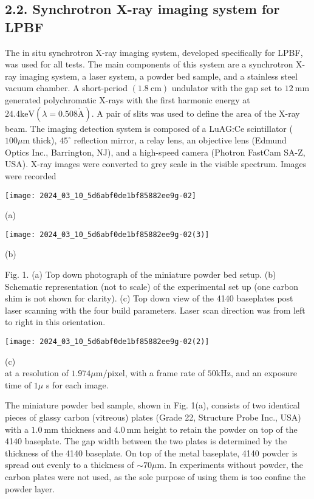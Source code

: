 \documentclass[10pt]{article}
\def\AA{\mathring{\mathrm{A}}}
\begin{document}
\subsection*{2.2. Synchrotron X-ray imaging system for LPBF}
The in situ synchrotron X-ray imaging system, developed specifically for LPBF, was used for all tests. The main components of this system are a synchrotron X-ray imaging system, a laser system, a powder bed sample, and a stainless steel vacuum chamber. A short-period $(1.8 \mathrm{~cm})$ undulator with the gap set to $12 \mathrm{~mm}$ generated polychromatic X-rays with the first harmonic energy at $24.4 \mathrm{keV}(\lambda=0.508 \AA)$. A pair of slits was used to define the area of the X-ray beam. The imaging detection system is composed of a LuAG:Ce scintillator ( $100 \mu \mathrm{m}$ thick), $45^{\circ}$ reflection mirror, a relay lens, an objective lens (Edmund Optics Inc., Barrington, NJ), and a high-speed camera (Photron FastCam SA-Z, USA). X-ray images were converted to grey scale in the visible spectrum. Images were recorded

\begin{center}
\texttt{[image: 2024\_03\_10\_5d6abf0de1bf85882ee9g-02]}
\end{center}

(a)

\begin{center}
\texttt{[image: 2024\_03\_10\_5d6abf0de1bf85882ee9g-02(3)]}
\end{center}

(b)

Fig. 1. (a) Top down photograph of the miniature powder bed setup. (b) Schematic representation (not to scale) of the experimental set up (one carbon shim is not shown for clarity). (c) Top down view of the 4140 baseplates post laser scanning with the four build parameters. Laser scan direction was from left to right in this orientation.

\begin{center}
\texttt{[image: 2024\_03\_10\_5d6abf0de1bf85882ee9g-02(2)]}
\end{center}

(c)\\
at a resolution of $1.974 \mu \mathrm{m} / \mathrm{pixel}$, with a frame rate of $50 \mathrm{kHz}$, and an exposure time of $1 \mu$ s for each image.

The miniature powder bed sample, shown in Fig. 1(a), consists of two identical pieces of glassy carbon (vitreous) plates (Grade 22, Structure Probe Inc., USA) with a $1.0 \mathrm{~mm}$ thickness and $4.0 \mathrm{~mm}$ height to retain the powder on top of the 4140 baseplate. The gap width between the two plates is determined by the thickness of the 4140 baseplate. On top of the metal baseplate, 4140 powder is spread out evenly to a thickness of $\sim 70 \mu \mathrm{m}$. In experiments without powder, the carbon plates were not used, as the sole purpose of using them is too confine the powder layer.
\end{document}
